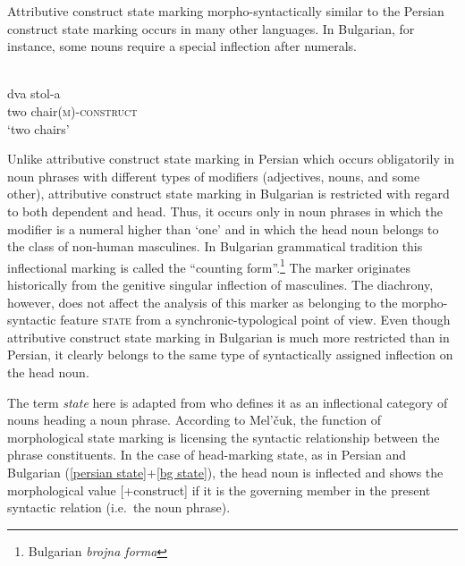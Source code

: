 Attributive construct state marking morpho-syntactically similar to the Persian construct state marking occurs in many other languages. In Bulgarian, for instance, some nouns require a special inflection after numerals.
\begin{exe}
\ex 
{}\\
\label{bg state}
\gll 	dva 	stol-a\\
	two	chair{\textsc{(m)-construct}}\\
\glt 	‘two chairs’
\end{exe}
Unlike attributive construct state marking in Persian which occurs obligatorily in noun phrases with different types of modifiers (adjectives, nouns, and some other), attributive construct state marking in Bulgarian is restricted with regard to both dependent and head. Thus, it occurs only in noun phrases in which the modifier is a numeral higher than ‘one’ and in which the head noun belongs to the class of non-human masculines. In Bulgarian grammatical tradition this inflectional marking is called the “counting form”.\footnote{Bulgarian \emph{brojna forma}} The marker originates historically from the genitive singular inflection of masculines. The diachrony, however, does not affect the analysis of this marker as belonging to the morpho-syntactic feature \textsc{state} from a synchronic-typological point of view. Even though attributive construct state marking in Bulgarian is much more restricted than in Persian, it clearly belongs to the same type of syntactically assigned inflection on the head noun.

The term \emph{state} here is adapted from \textcite[114–116]{melcuk2006} who defines it as an inflectional category of nouns heading a noun phrase. According to Mel'čuk, the function of morphological state marking is licensing the syntactic relationship between the phrase constituents. In the case of head-marking state, as in Persian and Bulgarian (\ref{persian state}+\ref{bg state}), the head noun is inflected and shows the morphological value [+construct] if it is the governing member in the present syntactic relation (i.e.~the noun phrase). 

